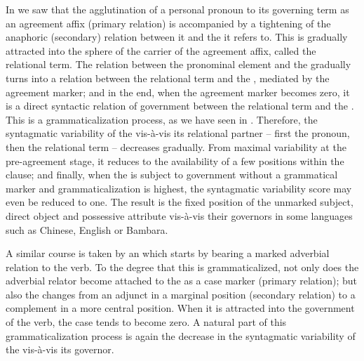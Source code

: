In  we saw that the agglutination of a personal pronoun to its governing term as an agreement affix (primary relation) is accompanied by a tightening of the anaphoric (secondary) relation between it and the \np it refers to. This \np is gradually attracted into the sphere of the carrier of the agreement affix, called the relational term. The relation between the pronominal element and the \np gradually turns into a relation between the relational term and the \np, mediated by the agreement marker; and in the end, when the agreement marker becomes zero, it is a direct syntactic relation of government between the relational term and the \np. This is a grammaticalization process, as we have seen in . Therefore, the syntagmatic variability of the \np vis-à-vis its relational partner -- first the pronoun, then the relational term -- decreases gradually. From maximal variability at the pre-agreement stage, it reduces to the availability of a few positions within the clause; and finally, when the \np is subject to government without a grammatical marker and grammaticalization is highest, the syntagmatic variability score may even be reduced to one. The result is the fixed position of the unmarked subject, direct object and possessive attribute vis-à-vis their governors in some languages such as Chinese, English or Bambara.

A similar course is taken by an \np which starts by bearing a marked adverbial relation to the verb. To the degree that this is grammaticalized, not only does the adverbial relator become attached to the \np as a case marker (primary relation); but also the \np changes from an adjunct in a marginal position (secondary relation) to a complement in a more central position. When it is attracted into the government of the verb, the case tends to become zero. A natural part of this grammaticalization process is again the decrease in the syntagmatic variability of the \np vis-à-vis its governor.

